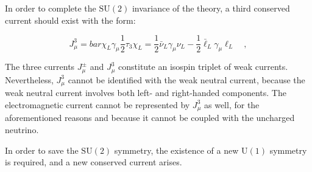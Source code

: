 In order to complete the $\mathrm{SU(2)}$ invariance of the theory, a third conserved current should exist with the form:

\begin{equation}
J_\mu^3 = bar{\chi}_L \gamma_\mu \dfrac{1}{2} \tau_3 \chi_L = \dfrac{1}{2}\bar{\nu}_L \gamma_\mu \nu_L -  \dfrac{1}{2}\bar{\ell}_L \gamma_\mu \ell_L \quad,
\end{equation}

The three currents $J_\mu^\pm$ and $J_\mu^3$ constitute an isospin triplet of weak currents. Nevertheless, $J_\mu^3$ cannot be identified with the weak neutral current, because the weak neutral current involves both left- and right-handed components. The electromagnetic current cannot be represented by $J_\mu^3$ as well, for the aforementioned reasons and because it cannot be coupled with the uncharged neutrino.

In order to save the $\mathrm{SU(2)}$ symmetry, the existence of a new $\mathrm{U(1)}$ symmetry is required, and a new conserved current arises.
